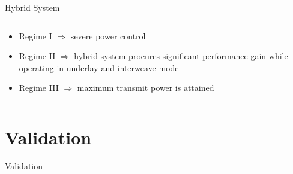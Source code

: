 \documentclass[16pt]{beamer}
\newif\ifhard
\begin{document}
\begin{frame}[t]{Hybrid System}
\begin{columns}
\begin{column}{0.55\columnwidth}
\begin{center}
{{
			}
                }
		\end{center}
		\vspace{-1mm}
		\begin{block}{}
			\begin{itemize}
				\item Regime I  $\Rightarrow$ severe power control
				\item Regime II $\Rightarrow$ hybrid system procures significant performance gain while operating in underlay and interweave mode
				\item Regime III $\Rightarrow$ maximum transmit power is attained 
			\end{itemize}	
		\end{block}
		\end{column}
	\end{columns}
\end{frame}

\fi
\fi


\ifhard

\section{Validation}
\begin{frame}[c]{}
\begin{center}
Validation
\end{center}
\end{frame}
\end{document}
